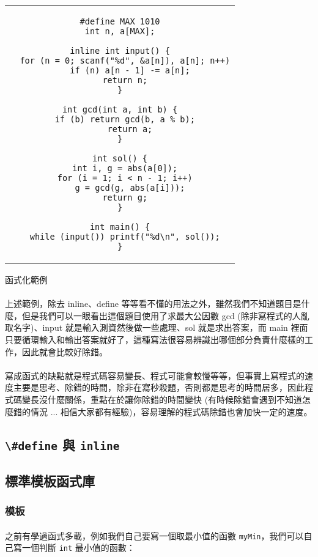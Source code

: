 \documentclass[12pt,a4paper,oneside]{report}
\begin{document}
\begin{CJK}{UTF8}{bkai}
\begin{code}[h!]
\begin{tabular}{c}
\begin{lstlisting}
#define MAX 1010
int n, a[MAX];

inline int input() {
  for (n = 0; scanf("%d", &a[n]), a[n]; n++)
    if (n) a[n - 1] -= a[n];
  return n;
}

int gcd(int a, int b) {
  if (b) return gcd(b, a % b);
    return a;
}

int sol() {
  int i, g = abs(a[0]);
  for (i = 1; i < n - 1; i++)
    g = gcd(g, abs(a[i]));
  return g;
}

int main() {
  while (input()) printf("%d\n", sol());
}
\end{lstlisting}
\end{tabular}
\caption{函式化範例}
\label{program:struct:code:input:function:example}
\end{code}

\paragraph{}上述範例，除去 inline、define 等等看不懂的用法之外，雖然我們不知道題目是什麼，但是我們可以一眼看出這個題目使用了求最大公因數 gcd (除非寫程式的人亂取名字)、input 就是輸入測資然後做一些處理、sol 就是求出答案，而 main 裡面只要循環輸入和輸出答案就好了，這種寫法很容易辨識出哪個部分負責什麼樣的工作，因此就會比較好除錯。

\paragraph{}寫成函式的缺點就是程式碼容易變長、程式可能會較慢等等，但事實上寫程式的速度主要是思考、除錯的時間，除非在寫秒殺題，否則都是思考的時間居多，因此程式碼變長沒什麼關係，重點在於讓你除錯的時間變快 (有時候除錯會遇到不知道怎麼錯的情況 ... 相信大家都有經驗)，容易理解的程式碼除錯也會加快一定的速度。

\subsection{\lstinline!\#define! 與 \lstinline!inline!}

\subsection{標準模板函式庫}

\subsubsection{模板}

\paragraph{}之前有學過函式多載，例如我們自己要寫一個取最小值的函數 \lstinline!myMin!，我們可以自己寫一個判斷 \lstinline!int! 最小值的函數：


\end{CJK}
\end{document}
